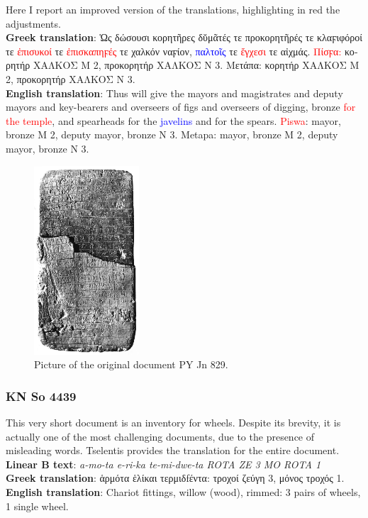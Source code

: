 Here I report an improved version of the translations, highlighting in red the adjustments. \\
\textbf{Greek translation}: \textgreek{Ὡς δώσουσι κορητῆρες δῠμᾶτές τε προκορητῆρές τε κλαϝιφόροί τε} \textcolor{red}{\textgreek{ἐπισυκοί}} \textgreek{τε} \textcolor{red}{\textgreek{ἐπισκαπηϝές}} \textgreek{τε χαλκόν ναϝίον,} \textcolor{blue}{\textgreek{παλτοῖς}} \textgreek{τε} \textcolor{red}{\textgreek{ἔγχεσι}} \textgreek{τε αἰχμάς.} \textcolor{red}{\textgreek{Πίσϝα:}} \textgreek{κορητήρ ΧΑΛΚΟΣ M 2, προκορητήρ ΧΑΛΚΟΣ N 3. Μετάπα: κορητήρ ΧΑΛΚΟΣ M 2, προκορητήρ ΧΑΛΚΟΣ N 3.} \\
\textbf{English translation}: Thus will give the mayors and magistrates and deputy mayors and key-bearers and overseers of figs and overseers of digging, bronze \textcolor{red}{for the temple}, and spearheads for the \textcolor{blue}{javelins} and for the spears. \textcolor{red}{Piswa}: mayor, bronze M 2, deputy mayor, bronze N 3. Metapa: mayor, bronze M 2, deputy mayor, bronze N 3.

\begin{figure}[H]
  \centering
  \includegraphics[width=0.35\textwidth]{Images/5072.png} %
  \caption{Picture of the original document PY Jn 829.}
  \label{fig:doc4}
\end{figure}

\subsubsection{KN So 4439}
This very short document is an inventory for wheels.
Despite its brevity, it is actually one of the most challenging documents, due to the presence of misleading words.
Tselentis provides the translation for the entire document. \\
\textbf{Linear B text}: \textit{a-mo-ta e-ri-ka te-mi-dwe-ta ROTA ZE 3 MO ROTA 1} \\
\textbf{Greek translation}: \textgreek{ἁρμότα ἑλίκαι τερμιδfέντα: τροχοί ζεύγη 3, μόνος τροχός 1.} \\
\textbf{English translation}: Chariot fittings, willow (wood), rimmed: 3 pairs of wheels, 1 single wheel.

